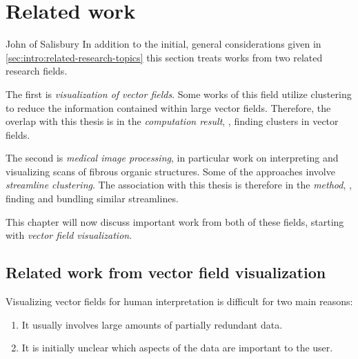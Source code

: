 

\chapter{Related work}\label{chp:related}

{John of Salisbury}
%
In addition to the initial, general considerations given in \autoref{sec:intro:related-research-topics} this section treats works from two related research fields.

The first is \emph{visualization of vector fields}. Some works of this field utilize clustering to reduce the information contained within large vector fields. Therefore, the overlap with this thesis is in the \emph{computation result}, \ie, finding clusters in vector fields.

The second is \emph{medical image processing}, in particular work on interpreting and visualizing scans of fibrous organic structures. Some of the approaches involve \emph{streamline clustering}. The association with this thesis is therefore in the \emph{method}, \ie, finding and bundling similar streamlines.

This chapter will now discuss important work from both of these fields, starting with \emph{vector field visualization}.


\section{Related work from vector field visualization}
\label{sec:related:vector_field_vis}

Visualizing vector fields for human interpretation is difficult for two main reasons:
\begin{enumerate}
  \item It usually involves large amounts of partially redundant data.
  \item It is initially unclear which aspects of the data are important to the user.
\end{enumerate}

